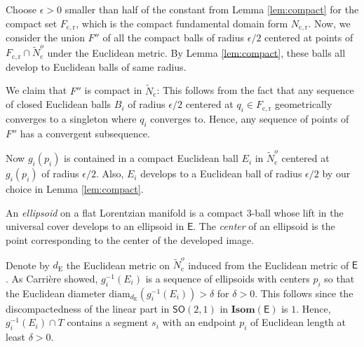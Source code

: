 \documentclass{amsart}
\numberwithin{equation}{section}
\newcommand\eps{\epsilon}
\newcommand\Isom{{\mathbf{Isom}}}
\newcommand\SO{{\mathsf{SO}}}
\newcommand\diam{{\mathrm{diam}  } }
\newcommand\Lspace{\mathsf E}
\theoremstyle{definition}
\theoremstyle{remark}
\newcommand{\romec}{\mathrm{c}}
\newcommand{\romecr}{{\mathrm{c}, \mathrm{r}}}
\newcommand{\romecrf}{{\mathrm{c}, \mathrm{r}, \mathrm{f}}}
\begin{document}
Choose $\eps>0$ smaller than half of the constant from Lemma 
\ref{lem:compact} for the compact set $F_{\romecr}$,
which is the compact fundamental domain form $N_{\romecr}$. 
Now, we consider the union $F''$ 
of all the compact balls of radius 
$\eps/2$ centered at points of 
$F_\romecr \cap \tilde N_{\romec}^o$ 
under the Euclidean metric. 
By Lemma \ref{lem:compact}, these balls all develop 
to Euclidean balls of same radius. 


We claim that $F''$ is compact in $\tilde N_{\romec} $: 
This follows from the fact that any sequence of closed Euclidean balls $B_i$ of radius $\eps/2$ centered at $q_i \in F_{\romecr}$ geometrically converges to a singleton where $q_i$ converges to. 
Hence, any sequence of points of $F''$ has a convergent subsequence. 

Now $g_i(p_i)$ is contained in a compact Euclidean ball  $E_i$ in $\tilde N_{\romec} ^o$ centered at $g_i(p_i)$ of radius $\eps/2$.
Also, $E_i$ develops to a Euclidean ball of radius $\eps/2$
by our choice in Lemma \ref{lem:compact}. 

An {\em ellipsoid} on a flat Lorentzian manifold is a compact $3$-ball whose lift
in the universal cover develops to an ellipsoid in $\Lspace$. 
The {\em center} of an ellipsoid is the point corresponding 
to the center of the developed image. 

Denote by $d_{\mathrm{E}}$ the Euclidean metric on $\tilde N_{\romec}^o$ 
 induced from the Euclidean metric of $\Lspace$.  
As Carri\`ere \cite{Carr89} showed, 
$g_i^{-1}(E_i)$ is a sequence of ellipsoids with centers $p_i$ 
so that the Euclidean diameter $\diam_{d_{\mathrm{E}}}(g_i^{-1}(E_i)) > \delta$ for $\delta> 0$. 
This follows since the discompactedness of the linear 
part in $\SO(2,1)$ in $\Isom(\Lspace)$ is $1$. 
Hence, $g_i^{-1}(E_i)\cap T$ 
contains a segment $s_i$ with an endpoint $p_i$ of Euclidean length at least 
$\delta> 0$. 
\end{document}
